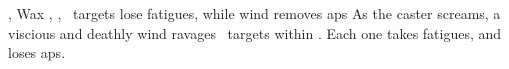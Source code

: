   {\mFate, \mAir}%
  {Wax}%
  {\distant, \duplicated, \divergent}%
  {}%
  {\spellArea\ targets lose  \glspl{fatigue}, while wind removes  \glspl{ap}}%
  {
    As the caster screams, a viscious and deathly wind ravages \spellArea\ targets within \spellRange.
    Each one takes  \glspl{fatigue}, and loses  \glspl{ap}.
  }

